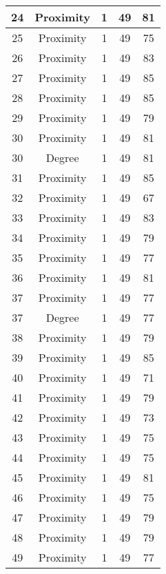 \documentclass[results.tex]{subfiles}
\begin{document}
\begin{center}
\begin{tabular}{| c || c | c | c | c |}
    \hline
    24 & Proximity & 1 & 49 & 81 \\ 
    \hline
    25 & Proximity & 1 & 49 & 75 \\ 
    \hline
    26 & Proximity & 1 & 49 & 83 \\ 
    \hline
    27 & Proximity & 1 & 49 & 85 \\ 
    \hline
    28 & Proximity & 1 & 49 & 85 \\ 
    \hline
    29 & Proximity & 1 & 49 & 79 \\ 
    \hline
    30 & Proximity & 1 & 49 & 81 \\ 
    \hline
    30 & Degree & 1 & 49 & 81 \\ 
    \hline
    31 & Proximity & 1 & 49 & 85 \\ 
    \hline
    32 & Proximity & 1 & 49 & 67 \\ 
    \hline
    33 & Proximity & 1 & 49 & 83 \\ 
    \hline
    34 & Proximity & 1 & 49 & 79 \\ 
    \hline
    35 & Proximity & 1 & 49 & 77 \\ 
    \hline
    36 & Proximity & 1 & 49 & 81 \\ 
    \hline
    37 & Proximity & 1 & 49 & 77 \\ 
    \hline
    37 & Degree & 1 & 49 & 77 \\ 
    \hline
    38 & Proximity & 1 & 49 & 79 \\ 
    \hline
    39 & Proximity & 1 & 49 & 85 \\ 
    \hline
    40 & Proximity & 1 & 49 & 71 \\ 
    \hline
    41 & Proximity & 1 & 49 & 79 \\ 
    \hline
    42 & Proximity & 1 & 49 & 73 \\ 
    \hline
    43 & Proximity & 1 & 49 & 75 \\ 
    \hline
    44 & Proximity & 1 & 49 & 75 \\ 
    \hline
    45 & Proximity & 1 & 49 & 81 \\ 
    \hline
    46 & Proximity & 1 & 49 & 75 \\ 
    \hline
    47 & Proximity & 1 & 49 & 79 \\ 
    \hline
    48 & Proximity & 1 & 49 & 79 \\ 
    \hline
    49 & Proximity & 1 & 49 & 77 \\ 
    \hline   \end{tabular}
\end{center}
\end{document}
